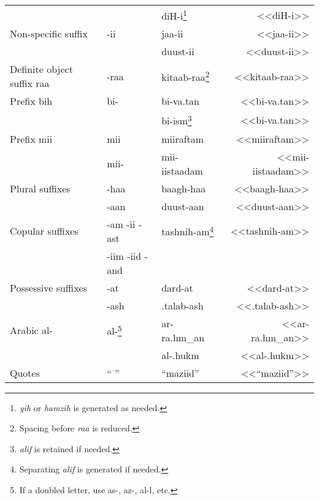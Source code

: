 \documentclass[12pt]{article}
\begin{document}
\begin{longtable}{lllr}
         &    & diH-i\footnote{\emph{yih} or \emph{hamzih} is generated as needed.} & <<diH-i>> \\
  Non-specific suffix & -ii & jaa-ii & <<jaa-ii>> \\
                      &     & duust-ii & <<duust-ii>> \\
  Definite object suffix raa & -raa & kitaab-raa\footnote{Spacing before \emph{raa} is reduced.} & <<kitaab-raa>> \\
  Prefix bih & bi- & bi-va.tan & <<bi-va.tan>> \\
             &     & bi-ism\footnote{\emph{alif} is retained if needed.} & <<bi-va.tan>> \\
  Prefix mii & mii  & miiraftam & <<miiraftam>> \\
             & mii- & mii-iistaadam & <<mii-iistaadam>> \\
  Plural suffixes & -haa & baagh-haa & <<baagh-haa>> \\
                  & -aan & duust-aan & <<duust-aan>> \\
  Copular suffixes & -am -ii -ast & tashnih-am\footnote{Separating \emph{alif} is generated if needed.} & <<tashnih-am>> \\
                  & -iim -iid -and & & \\
  Possessive suffixes & -at  & dard-at & <<dard-at>> \\
                      & -ash & .talab-ash & <<.talab-ash>> \\
  Arabic al- & al-\footnote{If a doubled letter, use as-, az-, al-l, etc.} & ar-ra.hm\_an & <<ar-ra.hm_an>> \\
             & & al-.hukm & <<al-.hukm>> \\
  Quotes & `` '' & ``maziid'' & <<``maziid''>> \\
\end{longtable}
\end{document}
